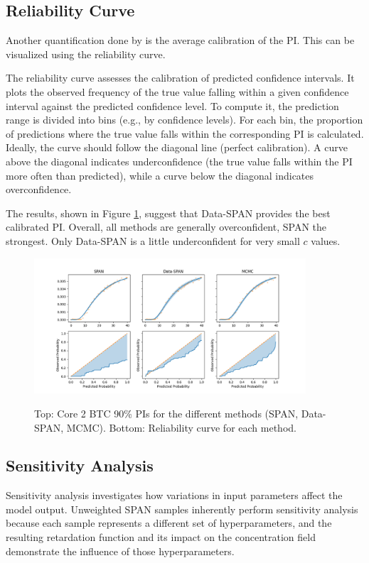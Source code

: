 \documentclass{article}
\begin{document}
\subsection{Reliability Curve}
Another quantification done by \textcite{finn} is the average calibration of the PI. This can be visualized using the reliability curve.

The reliability curve assesses the calibration of predicted confidence intervals. It plots the observed frequency of the true value falling within a given confidence interval against the predicted confidence level. To compute it, the prediction range is divided into bins (e.g., by confidence levels). For each bin, the proportion of predictions where the true value falls within the corresponding PI is calculated. Ideally, the curve should follow the diagonal line (perfect calibration). A curve above the diagonal indicates underconfidence (the true value falls within the PI more often than predicted), while a curve below the diagonal indicates overconfidence.

The results, shown in Figure \ref{fig:reliability_curves}, suggest that Data-SPAN provides the best calibrated PI. Overall, all methods are generally overconfident, SPAN the strongest. Only Data-SPAN is a little underconfident for very small $c$ values.

\begin{figure}
    \centering
    \includegraphics[width=0.9\textwidth]{figs/reliability_curves.png}
    \label{fig:reliability_curves}
    \caption{Top: Core 2 BTC 90\% PIs for the different methods (SPAN, Data-SPAN, MCMC). Bottom: Reliability curve for each method.}
\end{figure}


\subsection{Sensitivity Analysis}
\label{sec:sensitivity}
Sensitivity analysis investigates how variations in input parameters affect the model output. Unweighted SPAN samples inherently perform sensitivity analysis because each sample represents a different set of hyperparameters, and the resulting retardation function and its impact on the concentration field demonstrate the influence of those hyperparameters.
\end{document}
